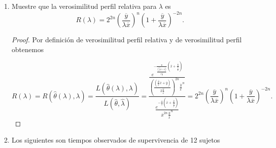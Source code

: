 \documentclass[letterpaper]{article}
\theoremstyle{definition}
\theoremstyle{lemathm}
\theoremstyle{lemathm}
\newtheorem{sol}{Solución}
\theoremstyle{lemathm}
\theoremstyle{lemademthm}
\newcommand{\pars}[1]{\left( #1 \right) }
\newcommand{\1}{\mathbbm{1}}
\begin{document}
\begin{enumerate}
\begin{sol}
			por lo tanto

			\[\begin{cases}
				\hat{\theta} &= \overline{x},\\[1ex]
				\hat{\lambda} &= \frac{\overline{y}}{\overline{x}}
			\end{cases}.\]

			La matriz de información de $\theta,\lambda$ es

			\[I\pars{\theta,\lambda} = \begin{pmatrix}
				\frac{2n\pars{\lambda\overline{x} + \overline{y}}}{\lambda\theta^3} - \frac{2n}{\theta^2} & \frac{n\overline{y}}{\lambda^2\theta^2}\\[1ex]
				\frac{n\overline{y}}{\lambda^2\theta^2} & \frac{2n\overline{y}}{\lambda^3\theta} - \frac{n}{\lambda^2}
			\end{pmatrix}\]

			\[I\pars{\hat{\theta},\hat{\lambda}} = \begin{pmatrix}
				\frac{2n}{\overline{x}^2} & \frac{n}{\overline{y}}\\[1ex]
				\frac{n}{\overline{y}} & \frac{n\overline{x}^2}{\overline{y}^2}
			\end{pmatrix},\]

			como $\overline{y} > 0$ entonces la $I$ es definida positva por lo tanto son máximos nuestros puntos críticos.
		\end{sol}

		\item Muestre que la verosimilitud perfil relativa para $\lambda$ es
		\[R\pars{\lambda} = 2^{2n}\pars{\frac{\overline{y}}{\lambda\overline{x}}}^n\pars{1+\frac{\overline{y}}{\lambda\overline{x}}}^{-2n}.\]

		\begin{proof}
			Por definición de verosimilitud perfil relativa y de verosimilitud perfil obtenemos

			\[R\pars{\lambda} = R\pars{\hat{\theta}\pars{\lambda},\lambda} = \frac{L\pars{\hat{\theta}\pars{\lambda},\lambda}}{L\pars{\hat{\theta},\hat{\lambda}}} = \frac{\frac{e^{-\frac{n}{\frac{\pars{\frac{\overline{y}}{\overline{x}}\overline{x} + \overline{y}}}{2\frac{\overline{y}}{\overline{x}}}}\pars{\overline{x}+\frac{\overline{y}}{\frac{\overline{y}}{\overline{x}}}}}}{\pars{\frac{\pars{\frac{\overline{y}}{\overline{x}}\overline{x} + \overline{y}}}{2\frac{\overline{y}}{\overline{x}}}}^{2n}\frac{\overline{y}}{\overline{x}}^n}}{\frac{e^{-\frac{n}{\overline{x}}\pars{\overline{x}+\frac{\overline{y}}{\frac{\overline{y}}{\overline{x}}}}}}{\overline{x}^{2n}\frac{\overline{y}}{\overline{x}}^n}}=2^{2n}\pars{\frac{\overline{y}}{\lambda\overline{x}}}^n\pars{1+\frac{\overline{y}}{\lambda\overline{x}}}^{-2n}.\]
		\end{proof}
		\item Los siguientes son tiempos observados de supervivencia de 12 sujetos
		

\end{enumerate}
\end{document}
